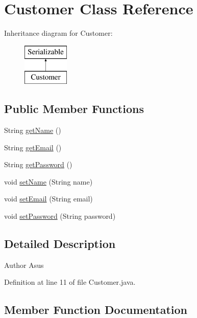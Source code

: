 \hypertarget{class_customer}{}\section{Customer Class Reference}
\label{class_customer}
Inheritance diagram for Customer\+:\begin{figure}[H]
\begin{center}
\leavevmode
\includegraphics[height=2.000000cm]{class_customer}
\end{center}
\end{figure}
\subsection*{Public Member Functions}
\begin{DoxyCompactItemize}
\item 
String \mbox{\hyperlink{class_customer_a105aeee9f0f26ee9f96e8be6333dbde3}{get\+Name}} ()
\item 
String \mbox{\hyperlink{class_customer_a67b00c2a42dfe312a6482df9efb2b021}{get\+Email}} ()
\item 
String \mbox{\hyperlink{class_customer_afcea772b0128389261e4027acb75c521}{get\+Password}} ()
\item 
void \mbox{\hyperlink{class_customer_a75927aaa172bff6dfd66b536486456e0}{set\+Name}} (String name)
\item 
void \mbox{\hyperlink{class_customer_afc0161323985dd102afa764d2a030e3c}{set\+Email}} (String email)
\item 
void \mbox{\hyperlink{class_customer_a5b6fe587094c77007702ccf9840b54c0}{set\+Password}} (String password)
\end{DoxyCompactItemize}


\subsection{Detailed Description}
\begin{DoxyAuthor}{Author}
Asus 
\end{DoxyAuthor}


Definition at line 11 of file Customer.\+java.



\subsection{Member Function Documentation}
\mbox{\label{class_customer_a67b00c2a42dfe312a6482df9efb2b021}} 
